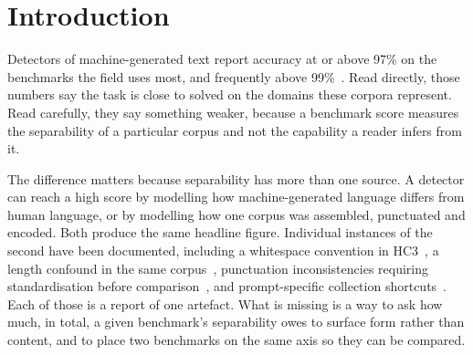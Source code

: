 \documentclass[conference,a4paper]{IEEEtran}
\begin{document}

\section{Introduction}

Detectors of machine-generated text report accuracy at or above 97\% on the benchmarks the field uses most, and frequently above 99\%~\cite{Guo2023close,Su2023plus,Zhou2024exploiting,Ansary2026multirepresentation}. Read directly, those numbers say the task is close to solved on the domains these corpora represent. Read carefully, they say something weaker, because a benchmark score measures the separability of a particular corpus and not the capability a reader infers from it.

The difference matters because separability has more than one source. A detector can reach a high score by modelling how machine-generated language differs from human language, or by modelling how one corpus was assembled, punctuated and encoded. Both produce the same headline figure. Individual instances of the second have been documented, including a whitespace convention in HC3~\cite{Tian2023multiscale}, a length confound in the same corpus~\cite{Baidya2026detecting}, punctuation inconsistencies requiring standardisation before comparison~\cite{Ardeshirifar2025comparing}, and prompt-specific collection shortcuts~\cite{Park2024investigating}. Each of those is a report of one artefact. What is missing is a way to ask how much, in total, a given benchmark's separability owes to surface form rather than content, and to place two benchmarks on the same axis so they can be compared.
\end{document}

